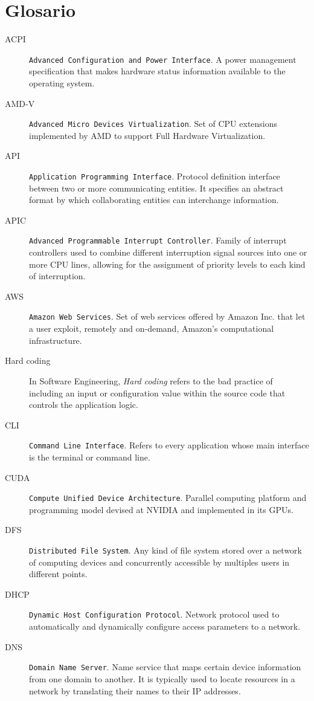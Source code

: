 \chapter{Glosario}\label{cap:glosario}
\begin{description}
\item[ACPI] \texttt{Advanced Configuration and Power Interface}. A power management specification that makes hardware status information available to the operating system.
\item[AMD-V] \texttt{Advanced Micro Devices Virtualization}. Set of CPU extensions implemented by AMD to support Full Hardware Virtualization.
\item[API] \texttt{Application Programming Interface}. Protocol definition interface between two or more communicating entities. It specifies an abstract format by which collaborating entities can interchange information.
\item[APIC] \texttt{Advanced Programmable Interrupt Controller}. Family of interrupt controllers used to combine different interruption signal sources into one or more CPU lines, allowing for the assignment of priority levels to each kind of interruption.
\item[AWS] \texttt{Amazon Web Services}. Set of web services offered by Amazon Inc. that let a user exploit, remotely and on-demand, Amazon's computational infrastructure.
\item[Hard coding] In Software Engineering, \emph{Hard coding} refers to the bad practice of including an input or configuration value within the source code that controls the application logic.
\item[CLI] \texttt{Command Line Interface}. Refers to every application whose main interface is the terminal or command line.
\item[CUDA] \texttt{Compute Unified Device Architecture}. Parallel computing platform and programming model devised at NVIDIA and implemented in its GPUs.
\item[DFS] \texttt{Distributed File System}. Any kind of file system stored over a network of computing devices and concurrently accessible by multiples users in different points.
\item[DHCP] \texttt{Dynamic Host Configuration Protocol}. Network protocol used to automatically and dynamically configure access parameters to a network.
\item[DNS] \texttt{Domain Name Server}. Name service that maps certain device information from one domain to another. It is typically used to locate resources in a network by translating their names to their IP addresses.

\end{description}
